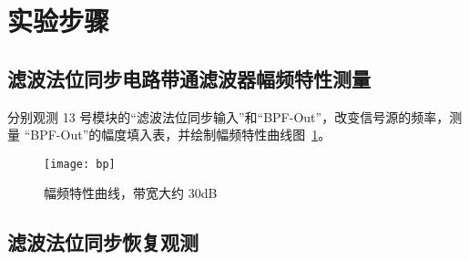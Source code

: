 \documentclass[../main]{subfiles}
\begin{document}
\section{实验步骤}%
\label{sec:\arabic{chapter}procedure}

\subsection{滤波法位同步电路带通滤波器幅频特性测量}%
\label{sub:bpf}




分别观测 13 号模块的“滤波法位同步输入”和“BPF-Out”，改变信号源的频率，测量
“BPF-Out”的幅度填入表，并绘制幅频特性曲线图~\ref{fig:bp}。


\begin{figure}[htbp]
  \centering
  \texttt{[image: bp]}
  \caption{幅频特性曲线，带宽大约 30dB}%
  \label{fig:bp}
\end{figure}

\subsection{滤波法位同步恢复观测}%
\label{sub:bit}
\end{document}
